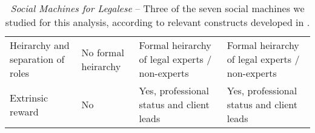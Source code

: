 \documentclass{sig-alternate}
\begin{document}
\begin{table}[htp]
\begin{tabular}{|p{3.5cm}|p{4cm}|p{4cm}|p{4cm}|}
    Heirarchy and separation of roles & No formal heirarchy                                                                                                                                                      & Formal heirarchy of legal experts / non-experts                                                          & Formal heirarchy of legal experts / non-experts                                     \\
    Extrinsic reward                  & No                                                                                                                                                                       & Yes, professional status and client leads                                                               & Yes, professional status and client leads                                          \\ \hline
    \end{tabular}
\caption{\emph{Social Machines for Legalese} -- Three of the seven social
  machines we studied for this analysis, according to relevant constructs developed in \cite{shadbolt:classif}.} \label{table:constructs}
\end{table}



\balancecolumns %
\end{document}
